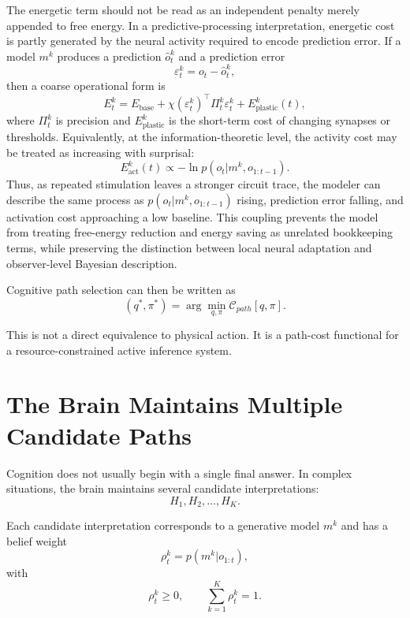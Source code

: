 \documentclass[11pt, a4paper]{article}
\begin{document}
The energetic term should not be read as an independent penalty merely appended to free energy. In a predictive-processing interpretation, energetic cost is partly generated by the neural activity required to encode prediction error. If a model $m^k$ produces a prediction $\hat o_t^k$ and a prediction error
\begin{equation}
\varepsilon_t^k
=
o_t-\hat o_t^k,
\end{equation}
then a coarse operational form is
\begin{equation}
E_t^k
=
E_{\mathrm{base}}
+
\chi(\varepsilon_t^k)^\top\Pi_t^k\varepsilon_t^k
+
E_{\mathrm{plastic}}^k(t),
\end{equation}
where $\Pi_t^k$ is precision and $E_{\mathrm{plastic}}^k$ is the short-term cost of changing synapses or thresholds. Equivalently, at the information-theoretic level, the activity cost may be treated as increasing with surprisal:
\begin{equation}
E_{\mathrm{act}}^k(t)
\propto
-\ln p(o_t|m^k,o_{1:t-1}).
\end{equation}
Thus, as repeated stimulation leaves a stronger circuit trace, the modeler can describe the same process as $p(o_t|m^k,o_{1:t-1})$ rising, prediction error falling, and activation cost approaching a low baseline. This coupling prevents the model from treating free-energy reduction and energy saving as unrelated bookkeeping terms, while preserving the distinction between local neural adaptation and observer-level Bayesian description.

Cognitive path selection can then be written as
\begin{equation}
(q^*,\pi^*)
=
\arg\min_{q,\pi}
\mathcal{C}_{path}[q,\pi].
\end{equation}

This is not a direct equivalence to physical action. It is a path-cost functional for a resource-constrained active inference system.

\section{The Brain Maintains Multiple Candidate Paths}

Cognition does not usually begin with a single final answer. In complex situations, the brain maintains several candidate interpretations:
\begin{equation}
H_1,H_2,\ldots,H_K.
\end{equation}

Each candidate interpretation corresponds to a generative model $m^k$ and has a belief weight
\begin{equation}
\rho_t^k
=
p(m^k|o_{1:t}),
\end{equation}
with
\begin{equation}
\rho_t^k \ge 0,
\qquad
\sum_{k=1}^{K}\rho_t^k=1.
\end{equation}
\end{document}
